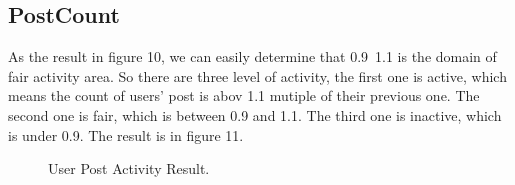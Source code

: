\documentclass[A4paper,twoside,twocolumn]{article}
\begin{document}
\subsection{PostCount}
As the result in figure 10, we can easily determine that 0.9~1.1 is the domain of fair activity area. So there are three level of activity, the first one is active, which means the count of users' post is abov 1.1 mutiple of their previous one. The second one is fair, which is between 0.9 and 1.1. The third one is inactive, which is under 0.9. The result is in figure 11.
	\begin{figure} [H]
	\centering 
	\caption{ User Post Activity Result. } 
	\label{fig} 
	\end{figure}
\end{document}
